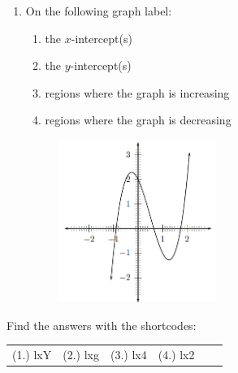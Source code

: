 \begin{exercises}{}
{\begin{enumerate}[noitemsep, label=\textbf{\arabic*}. ]
\item On the following graph label:
    \begin{enumerate}[noitemsep, label=\textbf{\alph*}. ] 
    \item the $x$-intercept(s)
    \item the $y$-intercept(s)
    \item regions where the graph is increasing
    \item regions where the graph is decreasing
    \end{enumerate}

\setcounter{subfigure}{0}
\begin{figure}[H] %
\begin{center}
\label{m39337*id237401!!!underscore!!!media}\label{m39337*id237401!!!underscore!!!printimage}\includegraphics[height=200px]{col11306.imgs/m39337_MG10C11_004.png} %
\vspace{2pt}
\vspace{.1in}
\end{center}
\end{figure}               
\end{enumerate}

\par {} Find the answers with the shortcodes:
\par \begin{tabular}[h]{cccccc}
(1.) lxY  &  (2.) lxg  &  (3.) lx4  &  (4.) lx2  & \end{tabular}
}
\end{exercises}
% 
%     
%     
%     
%     

